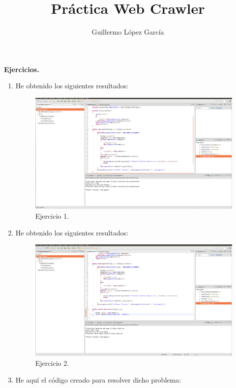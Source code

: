 \documentclass{article}
\title{Práctica Web Crawler}
\author{Guillermo López García}
\begin{document}
\maketitle

\textbf{Ejercicios.}
\begin{enumerate}
    \item He obtenido los siguientes resultados:
        \begin{figure}[H]
        \centering
        \includegraphics[width=0.7\linewidth]{./ej1}
        \caption{Ejercicio 1.}
        \end{figure}
    
    \item He obtenido los siguientes resultados:
        \begin{figure}[H]
        \centering
        \includegraphics[width=0.7\linewidth]{./ej2}
        \caption{Ejercicio 2.}
        \end{figure}
        
    \item He aquí el código creado para resolver dicho problema:
        
        
        
\end{enumerate}
\end{document}
